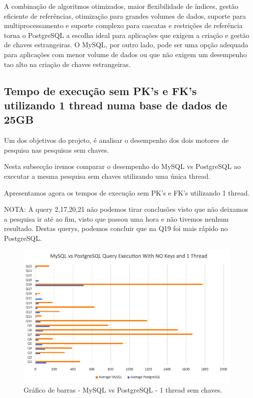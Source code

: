 \documentclass{article}
\begin{document}
A combinação de algoritmos otimizados, maior flexibilidade de índices, gestão eficiente de referências, otimização para grandes volumes de dados, suporte para multiprocessamento e suporte complexo para cascatas  e restrições de referência torna o PostgreSQL a escolha ideal para aplicações que exigem a criação e gestão de chaves estrangeiras. O MySQL, por outro lado, pode ser uma opção adequada para aplicações com menor volume de dados ou que não exigem um desempenho tao alto na criação de chaves estrangeiras.\\


\subsection{Tempo de execução sem PK's e FK's utilizando 1 thread numa base
de dados de 25GB}

\texttt{}\par Um dos objetivos do projeto, é analisar o desempenho dos dois motores de pesquisa nas pesquisas sem chaves.

Nesta subsecção iremos comparar o desempenho do MySQL vs PostgreSQL ao executar a mesma pesquisa sem chaves utilizando uma única thread.

Apresentamos agora os tempos de execução sem PK's e FK's utilizando 1 thread.

NOTA: A query 2,17,20,21 não podemos tirar conclusões visto que não deixamos a pesquisa ir até ao fim, visto que passou uma hora e não tivemos nenhum resultado. Destas querys, podemos concluir que na Q19 foi mais rápido no PostgreSQL.
\begin{figure}[H]
  \centering
  \includegraphics[width=\textwidth]{Graphs/mysqlvspostgres_withoutkeys_onethread.png}
  \caption{Gráfico de barras - MySQL vs PostgreSQL - 1 thread sem chaves.}
  \label{fig:PKCreation2}
\end{figure}
\end{document}
